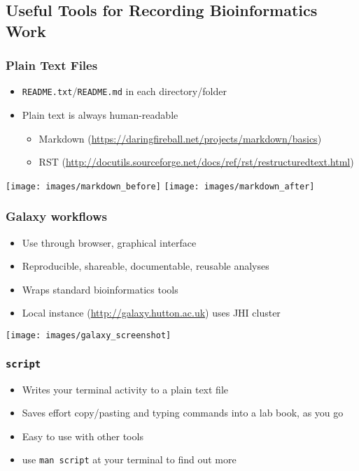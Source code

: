 %

\subsection{Useful Tools for Recording Bioinformatics Work}
\begin{frame}
  \frametitle{Plain Text Files}
  \begin{itemize}
    \item \texttt{README.txt}/\texttt{README.md} in each directory/folder
    \item Plain text is always human-readable
    \begin{itemize}
      \item Markdown (\url{https://daringfireball.net/projects/markdown/basics})
      \item RST (\url{http://docutils.sourceforge.net/docs/ref/rst/restructuredtext.html})
    \end{itemize}
  \end{itemize}
  \begin{center}
    \texttt{[image: images/markdown\_before]}
    \texttt{[image: images/markdown\_after]}
  \end{center}
\end{frame}
   
\begin{frame}
  \frametitle{Galaxy workflows}
  \begin{itemize}
    \item Use through browser, graphical interface
    \item Reproducible, shareable, documentable, reusable analyses
    \item Wraps standard bioinformatics tools
    \item Local instance (\url{http://galaxy.hutton.ac.uk}) uses JHI cluster
  \end{itemize}
  \begin{center}
    \texttt{[image: images/galaxy\_screenshot]}
  \end{center}
\end{frame}      
   
\begin{frame}
  \frametitle{\texttt{script}}
  \begin{itemize}
    \item Writes your terminal activity to a plain text file
    \item Saves effort copy/pasting and typing commands into a lab book, as you go
    \item Easy to use with other tools 
    \item use \texttt{man script} at your terminal to find out more
  \end{itemize}
\end{frame}   
   
